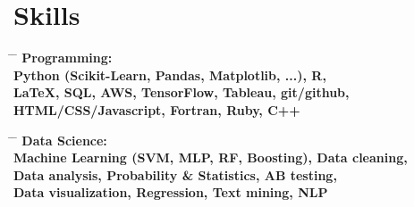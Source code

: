 \documentclass[10pt]{article} %
\begin{document}
\section{Skills}
\parbox{0.5\textwidth}{ %
\begin{tabbing}
\hspace{3cm} \= \hspace{4cm} \= \kill
\bf{Programming:} \\
Python (Scikit-Learn, Pandas, Matplotlib, ...), R, \\
LaTeX, SQL, AWS, TensorFlow, Tableau, git/github, \\
HTML/CSS/Javascript, Fortran, Ruby, C++ 
\end{tabbing}}
\hfill %
\parbox{0.5\textwidth}{ %
\begin{tabbing}
\hspace{3cm} \= \hspace{4cm} \= \kill
\bf{Data Science:} \\
Machine Learning (SVM, MLP, RF, Boosting), Data cleaning, \\
Data analysis, Probability \& Statistics, AB testing, \\
Data visualization, Regression, Text mining, NLP
\end{tabbing}}

\end{document}

